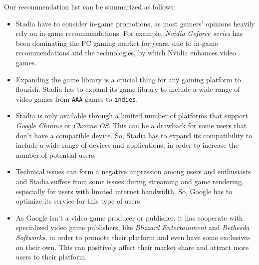 Our recommendation list can be summarized as follows:
\begin{itemize}
    \item Stadia have to consider in-game promotions, as most gamers' opinions heavily rely on in-game recommendations. For example, \emph{Nvidia Geforce series} has been dominating the PC gaming market for years, due to in-game recommendations and the technologies, by which Nvidia enhances video games.
    \item Expanding the game library is a crucial thing for any gaming platform to flourish. Stadia has to expand its game library to include a wide range of video games from \texttt{AAA} games to \texttt{indies}.
    \item Stadia is only available through a limited number of platforms that support \emph{Google Chrome} or \emph{Chrome OS}. This can be a drawback for some users that don't have a compatible device. So, Stadia has to expand its compatibility to include a wide range of devices and applications, in order to increase the number of potential users.
    \item Technical issues can form a negative impression among users and enthusiasts and Stadia suffers from some issues during streaming and game rendering, especially for users with limited internet bandwidth. So, Google has to optimize its service for this type of users.
    \item As Google isn't a video game producer or publisher, it has cooperate with specialized video game publishers, like \emph{Blizzard Entertainment} and \emph{Bethesda Softworks}, in order to promote their platform and even have some exclusives on their own. This can positively affect their market share and attract more users to their platform.
\end{itemize}

